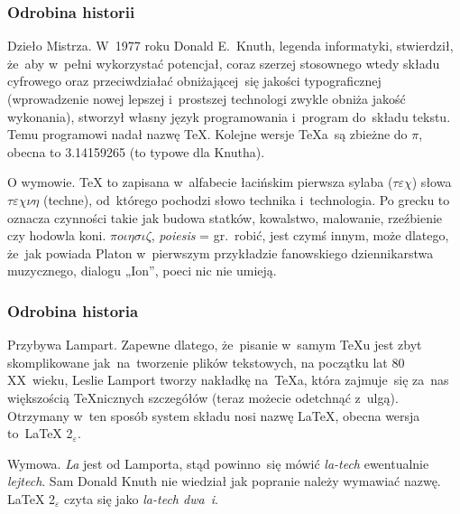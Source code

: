 \documentclass[10pt,t]{beamer}
\begin{document}
\begin{frame}
  \frametitle{Odrobina historii}


  Dzieło Mistrza. W~1977 roku Donald E.~Knuth, legenda informatyki,
  stwierdził,
  że~aby w~pełni wykorzystać potencjał, coraz szerzej stosownego
  wtedy składu cyfrowego oraz przeciwdziałać obniżającej~się jakości
  typograficznej (wprowadzenie nowej lepszej i~prostszej technologi
  zwykle obniża jakość wykonania), stworzył własny język
  programowania i~program do~składu tekstu. Temu programowi nadał
  nazwę \TeX. Kolejne wersje \TeX a~są zbieżne do $\pi$, obecna to
  3.14159265 (to typowe dla Knutha).


  O wymowie. \TeX{} to zapisana w~alfabecie łacińskim pierwsza sylaba
  ($\tau \varepsilon \chi$) słowa $\tau \varepsilon \chi \nu \eta$ (techne), od~którego pochodzi słowo technika
  i~technologia. Po grecku to oznacza czynności takie jak budowa statków,
  kowalstwo, malowanie, rzeźbienie czy hodowla koni. $\pi o \iota \eta \sigma \iota \zeta$,
  \textit{poiesis} = gr.~robić, jest czymś innym, może dlatego, że~jak
  powiada Platon w~pierwszym przykładzie fanowskiego dziennikarstwa
  muzycznego, dialogu „Ion”, poeci nic nie umieją.

\end{frame}





\begin{frame}
  \frametitle{Odrobina historia}


  Przybywa Lampart.
  Zapewne dlatego, że~pisanie w~samym \TeX u jest zbyt skomplikowane
  jak~na~tworzenie plików tekstowych, na początku lat 80 XX~wieku,
  Leslie Lamport tworzy nakładkę na~\TeX a, która zajmuje~się za~nas
  większością \TeX nicznych szczegółów (teraz możecie odetchnąć
  z~ulgą). Otrzymany w~ten sposób system składu nosi nazwę \LaTeX,
  obecna wersja to~\LaTeX{} 2$_{ \varepsilon }$.

  Wymowa. \textit{La} jest od Lamporta, stąd powinno~się mówić
  \textit{la-tech} ewentualnie \textit{lej\dywiz tech}. Sam Donald Knuth
  nie wiedział jak popranie należy wymawiać nazwę. \LaTeX{}
  2$_{ \varepsilon }$ czyta się jako \textit{la-tech dwa~i}.

\end{frame}
\end{document}
